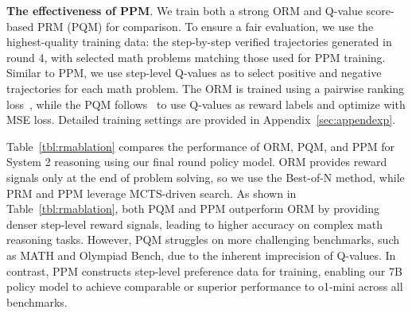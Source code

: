 \noindent\textbf{The effectiveness of PPM}. We train both a strong ORM and Q-value score-based PRM (PQM) for comparison. To ensure a fair evaluation, we use the highest-quality training data: the step-by-step verified trajectories generated in round 4, with selected math problems matching those used for PPM training.  Similar to PPM, we use step-level Q-values as  to select positive and negative trajectories for each math problem. 
The ORM is trained using a pairwise ranking loss~\citep{instructgpt}, while the PQM follows~\citep{alphamath,restmcts} to use Q-values as reward labels and optimize with MSE loss. Detailed training settings are provided in Appendix~\ref{sec:appendexp}.

\begin{table}[hpt]
	\small 
	\centering
	\caption{Ablation study on the reward model. Process reward models (PQM and PPM) outperform ORM, with PPM pushing the frontier of math reasoning capabilities.}
	\label{tbl:rmablation}
		\vspace{-1ex}
\end{table}




Table~\ref{tbl:rmablation} compares the performance of  ORM, PQM, and PPM for System 2 reasoning using our final round policy model. ORM provides reward signals only at the end of problem solving, so we use the Best-of-N method, while PRM and PPM leverage MCTS-driven search.  As shown in Table~\ref{tbl:rmablation}, both PQM and PPM outperform ORM by providing denser step-level reward signals, leading to higher accuracy on complex math reasoning tasks. However, PQM struggles on more challenging benchmarks, such as MATH and Olympiad Bench,  due to the inherent imprecision of Q-values.
In contrast, PPM constructs step-level preference data for  training, enabling our 7B policy model to achieve comparable or superior performance to o1-mini across all benchmarks.















